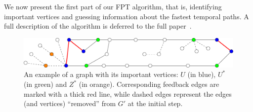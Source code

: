\documentclass[a4paper,UKenglish,cleveref, autoref, thm-restate]{lipics-v2021}
\begin{document}
We now present the first part of our FPT algorithm, that is, identifying important vertices and guessing information about the fastest temporal paths. A full description of the algorithm is deferred to the full paper~\cite{fullPaper}.

\begin{figure}[t]
	\centering
	\includegraphics[width=0.8\columnwidth]{fig-example-names-vertices_new}
	\caption{An example of a graph with its important vertices: $U$ (in blue), $U^*$ (in green) and $Z^*$ (in orange).
    Corresponding feedback edges are marked with a thick red line, while dashed edges represent the edges (and vertices) ``removed'' from $G'$ at the initial step.
	\label{fig:labelingVertices}}
\end{figure}
\end{document}
